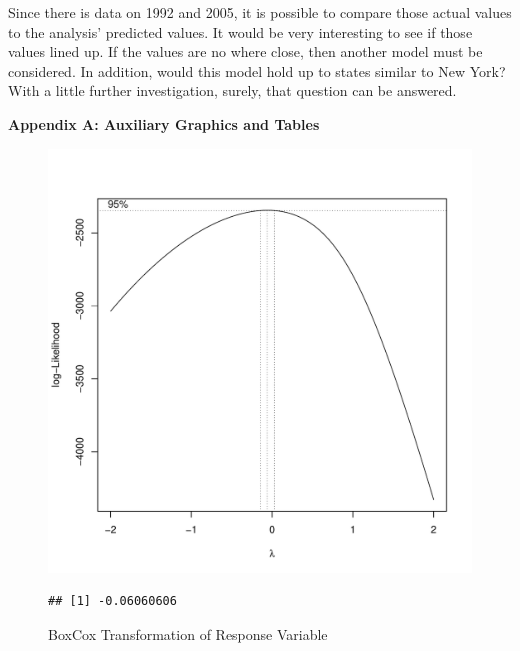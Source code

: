 \documentclass{article}\usepackage[]{graphicx}\usepackage[]{color}
\makeatletter
\def\maxwidth{ %
  \ifdim\Gin@nat@width>\linewidth
    \linewidth
  \else
    \Gin@nat@width
  \fi
}
\newenvironment{kframe}{%
 \def\at@end@of@kframe{}%
 \ifinner\ifhmode%
  \def\at@end@of@kframe{\end{minipage}}%
  \begin{minipage}{\columnwidth}%
 \fi\fi%
 \def\FrameCommand##1{\hskip\@totalleftmargin \hskip-\fboxsep
 \colorbox{shadecolor}{##1}\hskip-\fboxsep
     \hskip-\linewidth \hskip-\@totalleftmargin \hskip\columnwidth}%
 \MakeFramed {\advance\hsize-\width
   \@totalleftmargin\z@ \linewidth\hsize
   \@setminipage}}%
 {\par\unskip\endMakeFramed%
 \at@end@of@kframe}
\newenvironment{knitrout}{}{} %
\makeatother
\begin{document}
\qquad Since there is data on 1992 and 2005, it is possible to compare those actual values to the analysis' predicted values. It would be very interesting to see if those values lined up. If the values are no where close, then another model must be considered. In addition, would this model hold up to states similar to New York? With a little further investigation, surely, that question can be answered. 

%
\newpage
\noindent \Large{{\bf Appendix A: Auxiliary Graphics and Tables}}

%
\begin{figure}
\caption{BoxCox Transformation of Response Variable}
\begin{knitrout}
\color{fgcolor}
\includegraphics[width=\maxwidth,height=0.5\textheight]{figure/BoxCox_plot-1} 
\begin{kframe}\begin{verbatim}
## [1] -0.06060606
\end{verbatim}
\end{kframe}
\end{knitrout}
\end{figure}
%
\end{document}
